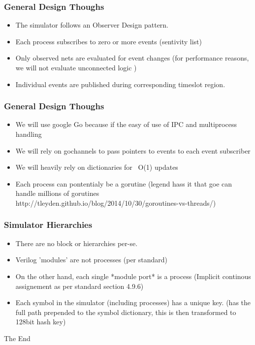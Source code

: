 \documentclass{beamer}
\begin{document}
\begin{frame}
\frametitle{General Design Thoughs}
\begin{itemize}
\item The simulator follows an Observer Design pattern.
\item Each process subscribes to zero or more events (sentivity list)
\item Only observed nets are evaluated for event changes (for performance reasons, we will not evaluate unconnected logic )
\item Individual events are published during corresponding timeslot region.
\end{itemize}
\end{frame}


\begin{frame}
\frametitle{General Design Thoughs}
\begin{itemize}
\item We will use google Go because if the easy of use of IPC and multiprocess handling
\item We will rely on gochannels to pass pointers to events to each event subscriber
\item  We will heavily rely on dictionaries for ~O(1) updates
\item Each process can pontentialy be a gorutine (legend hass it that goe can handle millions of gorutines http://tleyden.github.io/blog/2014/10/30/goroutines-vs-threads/)
\end{itemize}
\end{frame}


\begin{frame}
\frametitle{Simulator Hierarchies}
\begin{itemize}
\item There are no block or hierarchies per-se.
\item Verilog 'modules' are not processes (per standard)
\item On the other hand, each single *module port* is a process (Implicit continous assignement as per standard section 4.9.6)
\item Each symbol in the simulator (including processes) has a unique key. (has the full path prepended to the symbol dictionary, this is then transformed to 128bit hash key)	
\end{itemize}
\end{frame}


\begin{frame}
\Huge{\centerline{The End}}
\end{frame}

\end{document}
